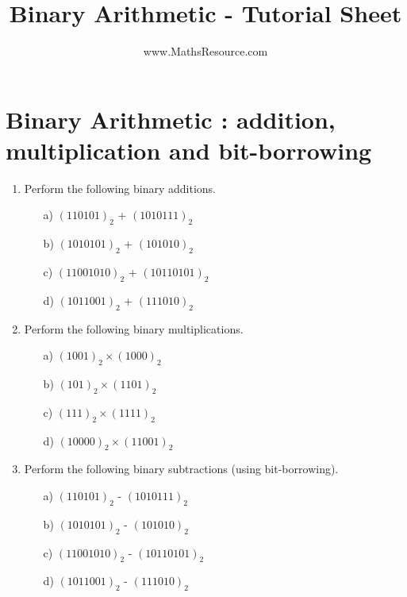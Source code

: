 \documentclass[]{article}
\title{Binary Arithmetic - Tutorial Sheet}
\author{www.MathsResource.com}
\begin{document}
\maketitle

\Large

\section*{Binary Arithmetic : addition, multiplication and bit-borrowing}
\begin{enumerate}
	\item Perform the following binary additions.
	\begin{multicols}{2}
		\begin{itemize}
			\item[a)] $(110101)_{2}$ + $(1010111)_{2}$
			\item[b)] $(1010101)_{2}$ + $(101010)_{2}$
			\item[c)] $(11001010)_{2}$ + $(10110101)_{2}$
			\item[d)] $(1011001)_{2}$ + $(111010)_{2}$
		\end{itemize}
	\end{multicols}
	\item Perform the following binary multiplications.
	\begin{multicols}{2}
		\begin{itemize}
			\item[a)] $(1001)_{2}\times( 1000)_{2}$  %
			\item[b)] $(101)_{2}\times(1101)_{2}$ %
			\item[c)] $(111)_{2}\times(1111)_{2}$ %
			\item[d)] $(10000)_{2}\times(11001)_{2}$    %
		\end{itemize}
		\end{multicols}		
	\item Perform the following binary subtractions (using bit-borrowing).
	\begin{multicols}{2}
		\begin{itemize}
			\item[a)] $(110101)_{2}$ - $(1010111)_{2}$
			\item[b)] $(1010101)_{2}$ - $(101010)_{2}$
			\item[c)] $(11001010)_{2}$ - $(10110101)_{2}$
			\item[d)] $(1011001)_{2}$ - $(111010)_{2}$
		\end{itemize}


\end{multicols}
\end{enumerate}
\end{document}
